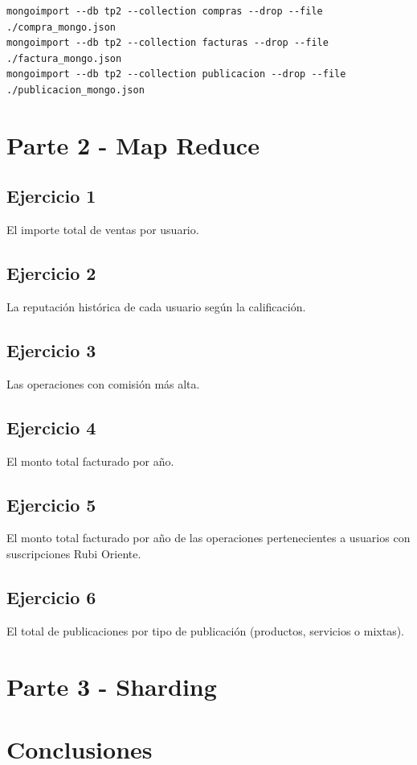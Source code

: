 \documentclass[a4paper, 10pt, twoside]{article}
\begin{document}
\begin{verbatim}
mongoimport --db tp2 --collection compras --drop --file ./compra_mongo.json 
mongoimport --db tp2 --collection facturas --drop --file ./factura_mongo.json
mongoimport --db tp2 --collection publicacion --drop --file ./publicacion_mongo.json
\end{verbatim}
\section{Parte 2 - Map Reduce}
\subsection{Ejercicio 1}
El importe total de ventas por usuario.
\subsection{Ejercicio 2}
La reputaci\'on hist\'orica de cada usuario seg\'un la calificaci\'on.
\subsection{Ejercicio 3}
Las operaciones con comisi\'on m\'as alta.
\subsection{Ejercicio 4}
El monto total facturado por año.
\subsection{Ejercicio 5}
El monto total facturado por año de las operaciones pertenecientes a usuarios con suscripciones Rubi Oriente.
\subsection{Ejercicio 6}
El total de publicaciones por tipo de publicaci\'on (productos, servicios o mixtas).
\section{Parte 3 - Sharding}

\section{Conclusiones}
\end{document}
